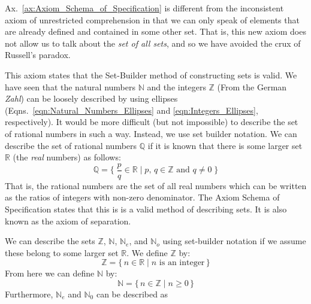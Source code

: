         Ax.~\ref{ax:Axiom_Schema_of_Specification} is different from the
        inconsistent axiom of unrestricted comprehension in that we can only
        speak of elements that are already defined and contained in some other
        set. That is, this new axiom does not allow us to talk about the
        \textit{set of all sets}, and so we have avoided the crux of Russell's
        paradox.
        \par\hfill\par
        This axiom states that the Set-Builder method of constructing sets is
        valid. We have seen that the natural numbers $\mathbb{N}$ and the
        integers $\mathbb{Z}$ (From the German \textit{Zahl}) can be loosely
        described by using ellipses (Eqns.~\ref{eqn:Natural_Numbers_Ellipses}
        and \ref{eqn:Integers_Ellipses}, respectively). It would be more
        difficult (but not impossible) to describe the set of rational numbers
        in such a way. Instead, we use set builder notation. We can describe the
        set of rational numbers $\mathbb{Q}$ if it is known that there is some
        larger set $\mathbb{R}$ (the \textit{real} numbers) as follows:
        \begin{equation}
            \mathbb{Q}=\Big\{\;\frac{p}{q}\in\mathbb{R}\;|\;
                                p,\,q\in\mathbb{Z}\textrm{ and }q\ne{0}\;\Big\}
        \end{equation}
        That is, the rational numbers are the set of all real numbers which can
        be written as the ratios of integers with non-zero denominator. The
        Axiom Schema of Specification states that this is is a valid method of
        describing sets. It is also known as the axiom of separation.
        \par\hfill\par
        We can describe the sets $\mathbb{Z}$, $\mathbb{N}$, $\mathbb{N}_{e}$,
        and $\mathbb{N}_{o}$ using set-builder notation if we assume these
        belong to some larger set $\mathbb{R}$. We define $\mathbb{Z}$ by:
        \begin{equation}
            \mathbb{Z}=
            \big\{\,n\in\mathbb{R}\;|\;n\textrm{ is an integer}\,\big\}
        \end{equation}
        From here we can define $\mathbb{N}$ by:
        \begin{equation}
            \mathbb{N}=\{\,n\in\mathbb{Z}\;|\;n\geq{0}\,\}
        \end{equation}
        Furthermore, $\mathbb{N}_{e}$ and $\mathbb{N}_{0}$ can be described as
